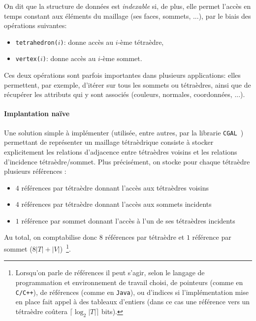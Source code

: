 On dit que la structure de données est \emph{indexable} si, de plus, elle permet l'accès en temps constant aux éléments du maillage (ses faces, sommets, ...), par le biais des opérations suivantes:
\begin{itemize}
\item \texttt{tetrahedron($i$)}: donne accès au $i$-ème tétraèdre,
\item \texttt{vertex($i$)}: donne accès au $i$-ème sommet.
\end{itemize}
Ces deux opérations sont parfois importantes dans plusieurs applications: elles permettent, par exemple, d'itérer sur tous les sommets ou tétraèdres,
ainsi que de récupérer les attributs qui y sont associés (couleurs, normales, coordonnées, ...).

\paragraph{Implantation naïve}
Une solution simple à implémenter (utilisée, entre autres, par la librarie \texttt{CGAL}~\cite{CGAL}) permettant de représenter un maillage tétraèdrique consiste à stocker explicitement les relations d'adjacence entre tétraèdres voisins et les relations d'incidence tétraèdre/sommet. Plus précisément,  on stocke pour chaque tétraèdre plusieurs références : 
\begin{itemize}
\item $4$ références par tétraèdre donnant l'accès aux tétraèdres voisins
\item $4$ références par tétraèdre donnant l'accès aux sommets incidents
\item $1$ référence par sommet donnant l'accès à l'un de ses tétraèdres incidents
\end{itemize}
Au total, on comptabilise donc $8$ références par tétraèdre et $1$ référence par sommet ($8|T|+|V|$)~\footnote{Lorsqu'on parle de références il peut s'agir, selon le langage de programmation et environnement de travail choisi, de pointeurs (comme en \texttt{C/C++}), 
de références (comme en \texttt{Java}), ou d'indices si l'implémentation mise en place fait appel à des tableaux d'entiers (dans ce cas une référence vers un tétraèdre co\^utera
$\lceil\log_2 |T|\rceil$ bits).}.